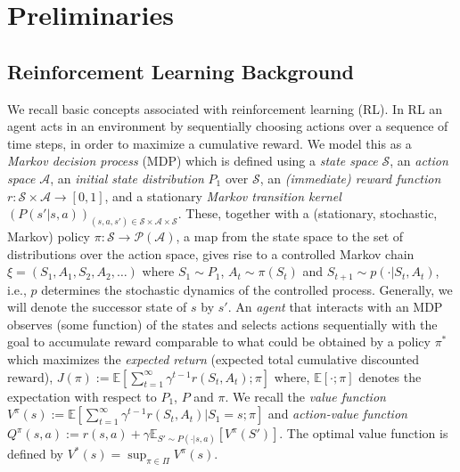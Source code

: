 \documentclass[letterpaper]{article}
\newcommand{\cA}{{\mathcal A}}
\newcommand{\cS}{{\mathcal S}}
\newcommand{\cP}{{\mathcal P}}
\newcommand{\E}{{\mathbb E}}
\newcommand{\R}{{\mathbb R}}
\begin{document}
\section{Preliminaries}

\subsection{Reinforcement Learning Background} \label{RLbackground}

We recall basic concepts associated with reinforcement learning (RL). In RL an agent acts in an environment by sequentially choosing actions over a sequence of time steps, in order to maximize a cumulative reward. We model this as a \emph{Markov decision process} (MDP) which is defined using 
a \emph{state space} $\cS$, 
an \emph{action space} $\cA$, 
an \emph{initial state distribution} $P_1$ over $\cS$, 
an \emph{(immediate) reward function} $r: \cS \times \cA \to [0,1]$,
and a stationary \emph{Markov transition kernel} $(P(s' |s,a))_{(s,a,s')\in \cS \times \cA \times \cS}$. 
These, together with a (stationary, stochastic, Markov) policy $\pi: \cS \to \cP(\cA)$, a map from the state space to the set of distributions over the action space, gives rise to a controlled Markov chain $\xi=(S_1,A_1,S_2,A_2,\dots)$ where $S_1 \sim P_1$, $A_t \sim \pi(S_t)$ and $S_{t+1} \sim p(\cdot|S_t,A_t)$, i.e., $p$ determines the stochastic dynamics of the controlled process.
Generally, we will denote the successor state of $s$ by $s'$. %
An \emph{agent} that interacts with an MDP observes (some function) of the states and selects actions sequentially with the goal 
to accumulate reward comparable to what could be obtained by a policy $\pi^*$ which maximizes the \emph{expected return} (expected total cumulative discounted reward), $J(\pi):= \E [\sum_{t=1}^\infty \gamma^{t-1} r(S_t,A_t) ; \pi]$ where,  $\E [ \cdot ; \pi]$ denotes the expectation with respect to $P_1$, $P$ and $\pi$. We recall the \emph{value function} $V^\pi(s) :=  \E [\sum_{t=1}^\infty \gamma^{t-1} r(S_t,A_t) | S_1 =s ; \pi]$ and \emph{action-value function} $Q^\pi(s,a) := r(s,a) + \gamma \E_{S'\sim P(\cdot|s,a)} [V^\pi(S')]$. The optimal value function is defined by $V^*(s) = \sup_{\pi\in\Pi} V^\pi(s)$.
\end{document}

